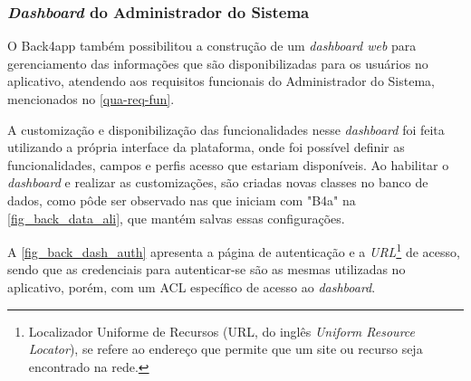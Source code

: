 \newpage

\subsubsection{\emph{Dashboard} do Administrador do Sistema}

O Back4app também possibilitou a construção de um \emph{dashboard web} para gerenciamento das informações que são disponibilizadas
para os usuários no aplicativo, atendendo aos requisitos funcionais do Administrador do Sistema, mencionados no \autoref{qua-req-fun}.

A customização e disponibilização das funcionalidades nesse \emph{dashboard} foi feita utilizando a própria
interface da plataforma, onde foi possível definir as funcionalidades, campos e perfis acesso que estariam
disponíveis. Ao habilitar o \emph{dashboard} e realizar as customizações, são criadas novas classes no banco
de dados, como pôde ser observado nas que iniciam com "B4a" na \autoref{fig_back_data_ali}, que mantém salvas
essas configurações.

A \autoref{fig_back_dash_auth} apresenta a página de autenticação e a \emph{URL}\footnote{Localizador Uniforme de Recursos
    (URL, do inglês \emph{Uniform Resource Locator}), se refere ao endereço que permite que um site ou recurso seja encontrado na rede.}
de acesso, sendo que as credenciais para autenticar-se são as mesmas utilizadas no aplicativo, porém, com um ACL específico de acesso ao \emph{dashboard}.

